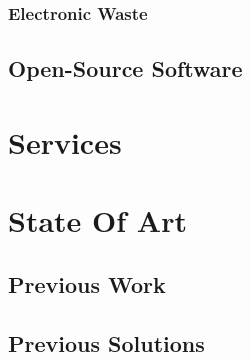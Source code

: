 \subsubsection{Electronic Waste}
\label{subsubsec:introduction_philosophy_reusability_electronic_waste}

\subsection{Open-Source Software}
\label{subsubsec:introduction_philosophy_reusability_open_source_software}

\section{Services}
\label{sec:introduction_services}

\section{State Of Art}
\label{sec:introduction_state_of_art}

\subsection{Previous Work}
\label{subsec:introduction_state_of_art_previous_work}

\subsection{Previous Solutions}
\label{subsec:introduction_state_of_art_previous_solutions}